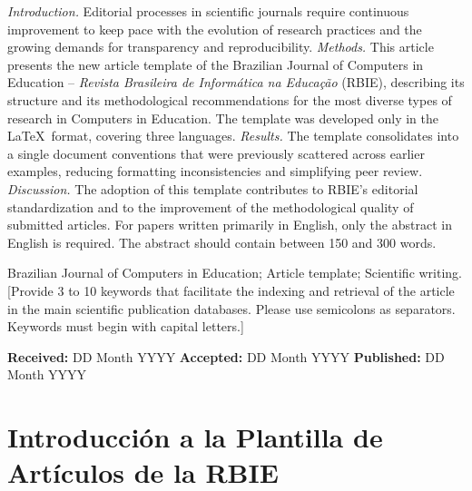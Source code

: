 \documentclass[spanish]{rbie2026}%
\begin{document}
\begin{frontmatter}
    \begin{abstract-en}
        \textit{Introduction.} Editorial processes in scientific journals require continuous improvement to keep pace with the evolution of research practices and the growing demands for transparency and reproducibility. \textit{Methods.} This article presents the new article template of the Brazilian Journal of Computers in Education -- \emph{Revista Brasileira de Informática na Educação} (RBIE), describing its structure and its methodological recommendations for the most diverse types of research in Computers in Education. The template was developed only in the \LaTeX\ format, covering three languages. \textit{Results.} The template consolidates into a single document conventions that were previously scattered across earlier examples, reducing formatting inconsistencies and simplifying peer review. \textit{Discussion.} The adoption of this template contributes to RBIE's editorial standardization and to the improvement of the methodological quality of submitted articles. For papers written primarily in English, only the abstract in English is required. The abstract should contain between 150 and 300 words.
    \end{abstract-en}

    \begin{keywords}
        Brazilian Journal of Computers in Education; Article template; Scientific writing. [Provide 3 to 10 keywords that facilitate the indexing and retrieval of the article in the main scientific publication databases. Please use semicolons as separators. Keywords must begin with capital letters.]
    \end{keywords}

    \begin{dates}
        {\sffamily\textbf{Received:}} DD Month YYYY \enspace\textbullet\enspace
        {\sffamily\textbf{Accepted:}} DD Month YYYY \enspace\textbullet\enspace
        {\sffamily\textbf{Published:}} DD Month YYYY
    \end{dates}

\end{frontmatter}




\section{Introducción a la Plantilla de Artículos de la RBIE}
\label{sec:intro}
\end{document}
